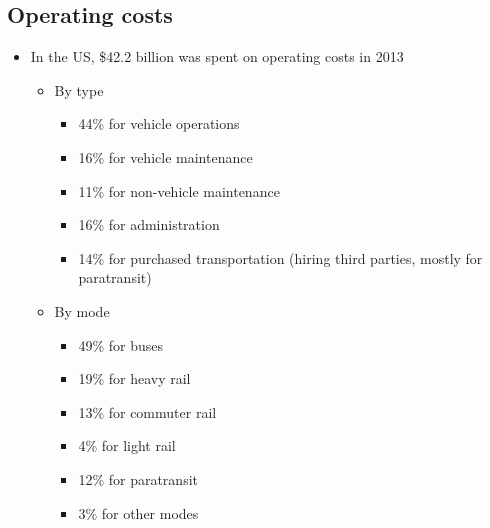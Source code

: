\documentclass[11pt]{article}
\begin{document}
\subsection{Operating costs}
\label{sec:orge010468}
\begin{itemize}
\item In the US, \$42.2 billion was spent on operating costs in 2013
\begin{itemize}
\item By type
\begin{itemize}
\item 44\% for vehicle operations
\item 16\% for vehicle maintenance
\item 11\% for non-vehicle maintenance
\item 16\% for administration
\item 14\% for purchased transportation (hiring third parties, mostly for paratransit)
\end{itemize}
\item By mode
\begin{itemize}
\item 49\% for buses
\item 19\% for heavy rail
\item 13\% for commuter rail
\item 4\% for light rail
\item 12\% for paratransit
\item 3\% for other modes
\end{itemize}
\end{itemize}
\end{itemize}
\end{document}
